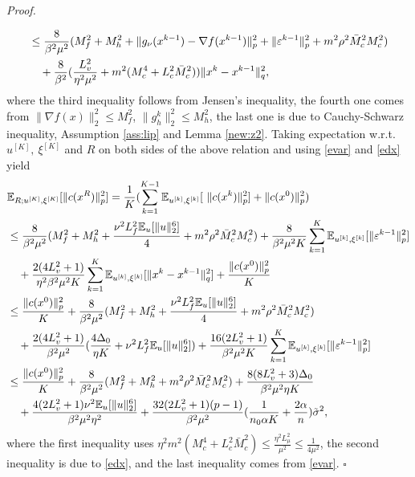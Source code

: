 \documentclass[11pt]{article}
\newenvironment{proof}[1][Proof]{%
    \par\noindent\textit{#1.}\enspace
  }{%
    \hfill\ensuremath{\square}\par
  }%
\numberwithin{equation}{section}
\newcommand{\E}{\mathbb{E}}
\begin{document}
\begin{proof}
\begin{align}
        &\leq \frac{8}{\beta^2 \mu^2 }(M_f^2+M_h^2+\|g_\nu(x^{k-1})-\nabla f(x^{k-1})\|_p^2+\|\varepsilon^{k-1}\|_p^2+m^2\rho^2\bar{M}_c^2M_c^2)\notag \\
        &\quad +\frac{8}{\beta^2}(\frac{L_v ^2}{\eta^2\mu^2}+m^2({M_c^4}+L_c^2\bar{M}_c^2))\|x^k-x^{k-1} \|_q^2, \notag 
    \end{align}
    where the third inequality follows from Jensen's inequality, the fourth one comes from $\|\nabla f(x)\|_2^2 \leq M_f^2$, $\|g_h^k\|_2^2 \leq M_h^2$, the last one is due to Cauchy-Schwarz inequality, Assumption \ref{ass:lip} and Lemma \ref{new:z2}. 
    Taking expectation w.r.t. $u^{[K]},~\xi^{[K]}$ and \(R\) on both sides of the above relation and using \eqref{evar} and \eqref{edx} yield
    \begin{align}
        &\E_{R;u^{[K]},\xi^{[K]}} [  \|    c ( x^R  )    \|_p^2 ]  
        =\frac{1}{K} ( \sum_{k=1}^{K-1} \E_{u^{[k]},\xi^{[k]}} [\ \|    c ( x^k  )    \|_p^2 ]  +\|c(x^0)\|_p^2 )\notag\\
        & \leq \frac{8}{\beta^2 \mu^2 }(M_f^2+M_h^2+\frac{\nu^2L_f^2\E_u[\|u\|_2^6]}{4}+m^2\rho^2\bar{M}_c^2M_c^2)+\frac{8}{\beta^2 \mu^2K} \sum_{k=1}^K \E_{u^{[k]},\xi^{[k]}}[\|\varepsilon^{k-1}\|_p^2]\notag\\
        &\quad +\frac{2(4L_v ^2+1)}{\eta^2\beta^2\mu^2K}\sum_{k=1}^K\E_{u^{[k]},\xi^{[k]}}[\|x^k - x^{k-1} \|_q^2] +\frac{\|c(x^0)\|_p^2}{K}\notag\\
        & \leq  \frac{\|c(x^0)\|_p^2}{K} + \frac{8}{\beta^2 \mu^2 }(M_f^2+M_h^2+\frac{\nu^2L_f^2\E_u[\|u\|_2^6]}{4}+m^2\rho^2\bar{M}_c^2M_c^2)\notag\\
        &\quad + \frac{2(4L_v^2+1)}{\beta^2\mu^2}(\frac{4\Delta_0}{\eta K}+\nu^2L_f^2\E_u[\|u\|_2^6])+\frac{16(2L_v^2+1)}{\beta^2\mu^2K}\sum_{k=1}^K \E_{u^{[k]},\xi^{[k]}}[\|\varepsilon^{k-1}\|_p^2]\label{eq:5.9}\\
        &\leq \frac{\|c(x^0)\|_p^2}{K} + \frac{8}{\beta^2 \mu^2 }(M_f^2+M_h^2+m^2\rho^2\bar{M}_c^2M_c^2)+\frac{8(8L_v^2+3)\Delta_0}{\beta^2\mu^2\eta K}\notag\\
        &\quad+\frac{4(2L_v^2+1)\nu^2\E_u[\|u\|_2^6]}{\beta^2\mu^2\eta^2} +\frac{32(2L_v^2+1)(p-1)}{\beta^2\mu^2}(\frac{1}{n_0 \alpha K} + \frac{2\alpha}{n})\tilde \sigma^2,\notag
    \end{align}
    where the first inequality uses \(\eta^2m^2({M_c^4}+L_c^2\bar{M}_c^2) \leq \frac{\eta^2L_\mu^2}{\mu^2} \leq \frac{1}{4\mu^2}\), the second inequality is due to \eqref{edx}, and the last inequality comes from \eqref{evar}.
\end{proof}
\end{document}
